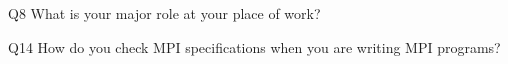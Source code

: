 \begin{description}%
\item{Q8} What is your major role at your place of work?%
\item{Q14} How do you check MPI specifications when you are writing MPI programs?%
\end{description}%
